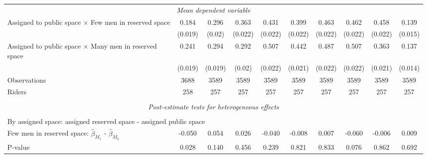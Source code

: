 \begin{tabular}{l*{9}{c}}
\multicolumn{10}{c}{\textit{Mean dependent variable}} \\ Assigned to public space $\times$ Few men in reserved space&       0.184         &       0.296         &       0.363         &       0.431         &       0.399         &       0.463         &       0.462         &       0.458         &       0.139         \\
\,                  &     (0.019)         &      (0.02)         &     (0.022)         &     (0.022)         &     (0.022)         &     (0.022)         &     (0.022)         &     (0.022)         &     (0.015)         \\
Assigned to public space $\times$ Many men in reserved space&       0.241         &       0.294         &       0.292         &       0.507         &       0.442         &       0.487         &       0.507         &       0.363         &       0.137         \\
\,                  &     (0.019)         &     (0.019)         &      (0.02)         &     (0.022)         &     (0.021)         &     (0.022)         &     (0.022)         &     (0.021)         &     (0.014)         \\
Observations        &        3688         &        3589         &        3589         &        3589         &        3589         &        3589         &        3589         &        3589         &        3589         \\
Riders              &         258         &         257         &         257         &         257         &         257         &         257         &         257         &         257         &         257         \\
\hline \\[-1ex]  \multicolumn{10}{c}{\textit{Post-estimate tests for heterogeneous effects}} \\\\[-1ex] \multicolumn{10}{l}{By assigned space: assigned reserved space - assigned public space} \\ \quad Few men in reserved space: $\hat\beta_{M_1}$ - $\hat\beta_{M_2}$&      -0.050         &       0.054         &       0.026         &      -0.040         &      -0.008         &       0.007         &      -0.060         &      -0.006         &       0.009         \\
\quad P-value       &       0.028         &       0.140         &       0.456         &       0.239         &       0.821         &       0.833         &       0.076         &       0.862         &       0.692         \\

\end{tabular}
